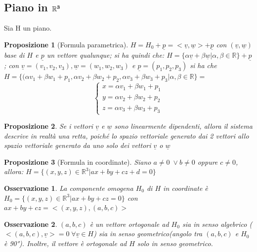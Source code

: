 \documentclass[12pt]{article}
\newenvironment{para}{\begin{adjustwidth}{13mm}{}}{\end{adjustwidth}}
\newtheorem{Proposizione}{Proposizione}[subsection]
\newtheorem{Osservazione}{Osservazione}[subsection]
\begin{document}
\begin{para}
\subsection{Piano in $\bold{\mathbb{R}^3}$}
Sia H un piano.
\begin{Proposizione}[Formula parametrica]
    $H = H_0 + \underline{p} = <\underline{v}, \underline{w}> + \underline{p}$ con $(\underline{v}, \underline{w})$ base di $H$ e $\underline{p}$ un vettore qualunque; si ha quindi che: \newline
    $H = \{\alpha\underline{v} + \beta\underline{w} | \alpha, \beta \in \mathbb{R}\} + \underline{p}$; con $\underline{v} = (v_1,v_2,v_3), \underline{w} = (w_1, w_2, w_3)$ e $\underline{p} = (p_1, p_2, p_3)$ si ha che $H = \{(\alpha v_1 + \beta w_1 + p_1, \alpha v_2 + \beta w_2 + p_2, \alpha v_3 + \beta w_3 + p_3| \alpha, \beta \in \mathbb{R}\} = $ $$\begin{cases}
        x = \alpha v_1 + \beta w_1 + p_1 \\
        y = \alpha v_2 + \beta w_2 + p_2 \\
        z = \alpha v_3 + \beta w_3 + p_3
    \end{cases}$$
\end{Proposizione}
\begin{Proposizione}
    Se i vettori $\underline{v}$ e $\underline{w}$ sono linearmente dipendenti, allora il sistema descrive in realtà una retta, poiché lo spazio vettoriale generato dai 2 vettori allo spazio vettoriale generato da uno solo dei vettori $\underline{v}$ o $\underline{w}$
\end{Proposizione}
\begin{Proposizione}[Formula in coordinate] Siano $a \neq 0 \; \lor b \neq 0 $ oppure $c \neq 0$, allora:
$H = \{(x,y,z)\in \mathbb{R}^3 | ax+by+cz+d= 0\}$
\end{Proposizione}
\begin{Osservazione}
    La componente omogena $H_0$ di $H$ in coordinate è \newline $H_0 = \{(x,y,z)\in \mathbb{R}^3 | ax+by+cz = 0\}$ con $ax+by+cz = <(x,y,z),(a,b,c)>$
\end{Osservazione}
\begin{Osservazione}
    $(a,b,c)$ è un vettore ortogonale ad $H_0$ sia in senso algebrico ($<(a,b,c), \underline{v}> = 0 \; \forall \underline{v} \in H$) sia in senso geometrico(angolo tra $(a,b,c)$ e $H_0$ è 90°). Inoltre, il vettore è ortogonale ad $H$ solo in senso geometrico.
\end{Osservazione}

\end{para}
\end{document}
